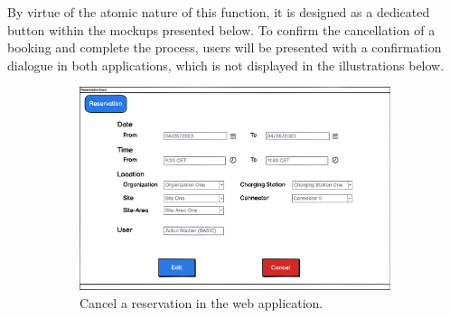 \noindent By virtue of the atomic nature of this function, it is designed as a dedicated button within the mockups presented below. To confirm the cancellation of a booking and complete the process, users will be presented with a confirmation dialogue in both applications, which is not displayed in the illustrations below.

\begin{figure}[h]
    \centering
     \begin{subfigure}[c]{0.6\textwidth}
         \includegraphics[width=\textwidth]{resources/images/main/5_design/mockups/cancel_reservation/web/Cancel_Reservation.png}
         \captionsetup{skip=33pt}
         \caption{Cancel a reservation in the web application.}
         \label{fig:web-cancel-reservation-mockup}
    \end{subfigure}
     \hfill
     \begin{subfigure}[c]{0.3\textwidth}

\end{subfigure}
\end{figure}
